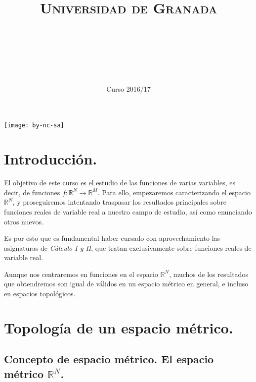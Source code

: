 \documentclass[11pt, a4paper, titlepage]{article}
\title{
  \normalfont \normalsize 
  \textsc{Universidad de Granada} \\ [25pt]    %
  \horrule{0.5pt} \\[0.4cm] %
  \huge \subject\\ %
  \horrule{2pt} \\[0.5cm] %
}
\author{\Large{\docauthor}}
\date{\vspace{-1.5em} \normalsize Curso 2016/17}
\theoremstyle{theorem-style}
\theoremstyle{definition-style}
\theoremstyle{remark-style}
\theoremstyle{example-style}
\begin{document}
\maketitle  %
\tableofcontents    %
\vfill
\begin{center}
\texttt{[image: by-nc-sa]}  %
\end{center}
\newpage

\section*{Introducción.}

El objetivo de este curso es el estudio de las funciones de varias variables, es decir, de funciones $f: \mathbb{R}^N \longrightarrow \mathbb{R}^M$. Para ello, empezaremos caracterizando el espacio $\mathbb{R}^N$, y proseguiremos intentando traspasar los resultados principales sobre funciones reales de variable real a nuestro campo de estudio, así como enunciando otros nuevos.

Es por esto que es fundamental haber cursado con aprovechamiento las asignaturas de \emph{Cálculo I y II}, que tratan exclusivamente sobre funciones reales de variable real.

Aunque nos centraremos en funciones en el espacio $\mathbb{R}^N$, muchos de los resultados que obtendremos son igual de válidos en un espacio métrico en general, e incluso en espacios topológicos.

\newpage


\section{Topología de un espacio métrico.}

\subsection{Concepto de espacio métrico. El espacio métrico $\mathbb{R}^N$.}
\end{document}
